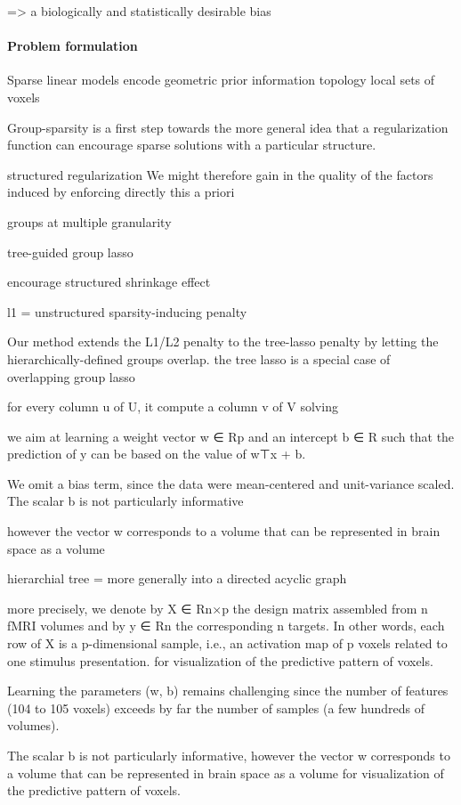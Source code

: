 \documentclass{article} %
\begin{document}
=> 
 a biologically and statistically desirable bias 


\paragraph{Problem formulation}

Sparse linear models
encode geometric prior information
topology
local sets of voxels

Group-sparsity is a first step towards the more general idea that
a regularization function can encourage sparse solutions with a particular structure. 


structured regularization
We might therefore gain in the quality of the factors
induced by enforcing directly this a priori 

groups at multiple granularity

tree-guided group lasso

encourage structured shrinkage effect 

l1 = unstructured sparsity-inducing penalty

Our method extends the L1/L2 penalty to the tree-lasso penalty
by letting the hierarchically-defined groups overlap. 
the tree lasso is a special case of overlapping group lasso

for every column u of U, it compute a column v of V solving

we aim at learning a weight vector w ∈ Rp and an intercept b ∈ R
such that the prediction of y can be based on the value of w⊤x + b.

We omit a bias term, since the data were mean-centered
and unit-variance scaled.
The scalar b is not particularly informative

however the vector w corresponds to a volume that
can be represented in brain space as a volume

hierarchial tree = more generally into a directed acyclic graph

more precisely, we denote by X ∈ Rn×p the design matrix
assembled from n fMRI volumes and by y ∈ Rn the corresponding n targets.
In other words, each row of X is a p-dimensional sample,
i.e., an activation map of p voxels related to one stimulus presentation.
for visualization of the predictive pattern of voxels. 

Learning the parameters (w, b) remains challenging
since the number of features (104 to 105 voxels) exceeds
by far the number of samples (a few hundreds of volumes). 

The scalar b is not particularly informative,
however the vector w corresponds to a volume that
can be represented in brain space as a volume
for visualization of the predictive pattern of voxels.
\end{document}

